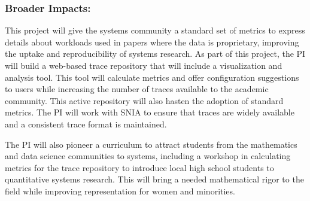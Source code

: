 

\subsubsection*{Broader Impacts: }

This project will give the systems community a standard set of metrics to
express details about workloads used in papers where the data is proprietary,
improving the uptake and reproducibility of systems research.  As part of this
project, the PI will build a web-based trace repository that will include a
visualization and analysis tool. This tool will calculate metrics and offer
configuration suggestions to users while increasing the number of traces
available to the academic community.  This active repository will also hasten
the adoption of standard metrics.  The PI will work with SNIA to ensure that
traces are widely available and a consistent trace format is maintained.

The PI will also pioneer a curriculum to attract students from the mathematics
and data science communities to systems, including a workshop in calculating metrics for the trace repository to introduce local high school students
to quantitative systems research.  This will bring a needed mathematical rigor
to the field while improving representation for women and
minorities.  




